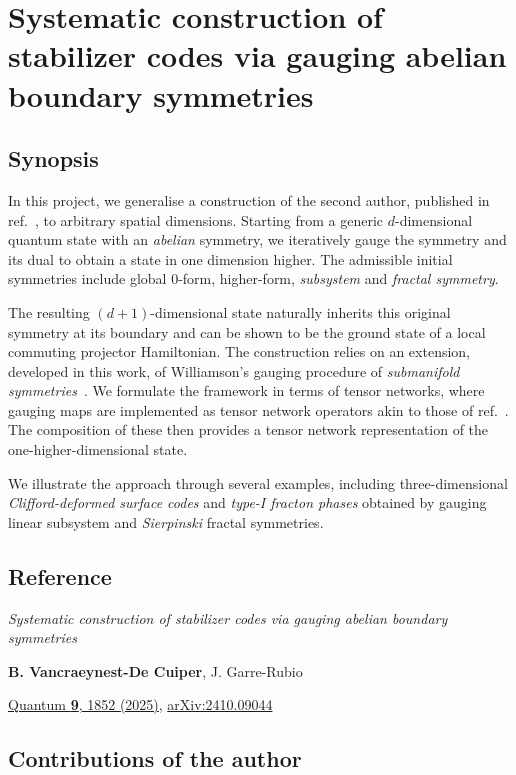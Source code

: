 \chapter{Systematic construction of stabilizer codes via gauging abelian boundary symmetries}\label{app:codes}
\section{Synopsis}
In this project, we generalise a construction of the second author, published in ref.~\cite{GarreRubio2024}, to arbitrary spatial dimensions. Starting from a generic $d$-dimensional quantum state with an \emph{abelian} symmetry, we iteratively gauge the symmetry and its dual to obtain a state in one dimension higher. The admissible initial symmetries include global 0-form, higher-form, \emph{subsystem} and \emph{fractal symmetry}.

The resulting $(d+1)$-dimensional state naturally inherits this original symmetry at its boundary and can be shown to be the ground state of a local commuting projector Hamiltonian. The construction relies on an extension, developed in this work, of Williamson’s gauging procedure of \emph{submanifold symmetries}~\cite{Williamson2016b}. We formulate the framework in terms of tensor networks, where gauging maps are implemented as tensor network operators akin to those of ref.~\cite{Haegeman2014a}. The composition of these then provides a tensor network representation of the one-higher-dimensional state.

We illustrate the approach through several examples, including three-dimensional \emph{Clifford-deformed surface codes} and \emph{type-I fracton phases} obtained by gauging linear subsystem and \emph{Sierpinski} fractal symmetries.
\section{Reference}
\textit{Systematic construction of stabilizer codes via gauging abelian boundary symmetries} \par\noindent
\textbf{B. Vancraeynest-De Cuiper}, J. Garre-Rubio \par\noindent
\href{https:/doi.org/10.22331/q-2025-09-08-1852}{Quantum \textbf{9}, 1852 (2025)}, \href{https://doi.org/10.48550/arXiv.2410.09044}{arXiv:2410.09044}
\section{Contributions of the author}

